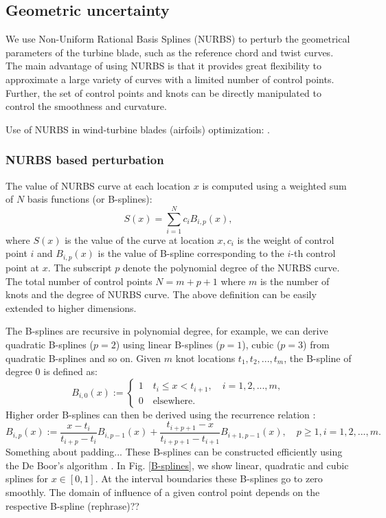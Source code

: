 \documentclass[review]{elsarticle}
\numberwithin{equation}{section}
\numberwithin{equation}{section}
\begin{document}
\subsection{Geometric uncertainty}
We use Non-Uniform Rational Basis Splines (NURBS) \cite{rogers2000} to perturb the geometrical parameters of the turbine blade, such as the reference chord and twist curves. The main advantage of using NURBS is that it provides great flexibility to approximate a large variety of curves with a limited number of control points. Further, the set of control points and knots can be directly manipulated to control the smoothness and curvature.

Use of NURBS in wind-turbine blades (airfoils) optimization: \cite{Ribeiro2012,Bottasso2014}.

\subsubsection{NURBS based perturbation}
The value of NURBS curve at each location $x$ is computed using a weighted sum of $N$ basis functions (or B-splines):
\begin{equation}\label{NURB_curve}
S(x)  = \sum_{i=1}^{N} c_i B_{i,p}(x),
\end{equation}
where $S(x)$ is the value of the curve at location $x, c_i$ is the weight of control point $i$ and $B_{i,p}(x)$ is the value of B-spline corresponding to the $i$-th control point at $x$. The subscript $p$ denote the polynomial degree of the NURBS curve. The total number of control points $N = m+p+1$ where $m$ is the number of knots  and the degree of NURBS curve. The above definition can be easily extended to higher dimensions. 

The B-splines are recursive in polynomial degree, for example, we can derive quadratic B-splines ($p=2$) using linear B-splines ($p=1$), cubic ($p=3$) from quadratic B-splines and so on. Given $m$ knot locations $t_1, t_2, ..., t_{m}$, the B-spline of degree 0 is defined as:
\begin{equation}\label{linearBspline}
B_{i,0}(x) :=
\begin{cases}
1\quad t_i\leq x < t_{i+1},\quad i = 1,2,...,m,\\
0\quad\text{elsewhere.}
\end{cases} 
\end{equation}
Higher order B-splines can then be derived using the recurrence relation \cite{deBoor}:
\begin{equation}\label{NURBS_recurrence}
B_{i,p}(x) := \frac{x-t_i}{t_{i+p} - t_i}B_{i,p-1}(x) + \frac{t_{i+p+1}  -  x}{t_{i+p+1}  -  t_{i+1}}B_{i+1,p-1}(x),\quad p\geq1, i = 1,2,...,m.
\end{equation} 
Something about padding...
These B-splines can be constructed efficiently using the De Boor's algorithm \cite{deBoor}. In Fig. \ref{B-splines}, we show linear, quadratic and cubic splines for $x\in[0,1]$. At the interval boundaries these B-splines go to zero smoothly. The domain of influence of a given control point depends on the respective B-spline (rephrase)??
\end{document}
